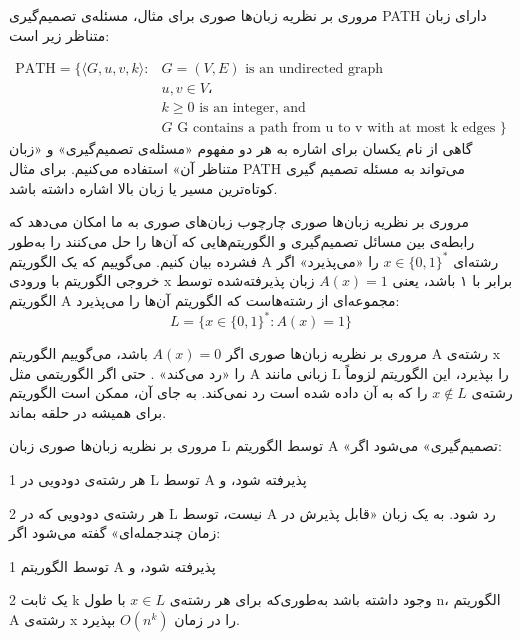 \begin{itemframe}{مروری بر نظریه زبان‌ها صوری}
\itm
برای مثال، مسئله‌ی تصمیم‌گیری PATH دارای زبان متناظر زیر است:

\begin{align*}
\text{PATH} = \{ \langle G, u, v, k \rangle :  & G = (V, E) \text{ is an undirected graph } \\
				& u, v \in V، \\
				& k \geq 0 \text{ is an integer, and } \\
				& G \text{ G contains a path from u to v with at most k edges }
\}
\end{align*}
\itm
گاهی از نام یکسان برای اشاره به هر دو مفهوم «مسئله‌ی تصمیم‌گیری» و «زبان متناظر آن» استفاده می‌کنیم. برای مثال PATH می‌تواند به مسئله تصمیم گیری کوتاه‌ترین مسیر یا زبان بالا اشاره داشته باشد.
\end{itemframe}


\begin{itemframe}{مروری بر نظریه زبان‌ها صوری}
\itm
چارچوب زبان‌های صوری به ما امکان می‌دهد که رابطه‌ی بین مسائل تصمیم‌گیری و الگوریتم‌هایی که آن‌ها را حل می‌کنند را به‌طور فشرده بیان کنیم.
\itm
می‌گوییم که یک الگوریتم A رشته‌ای
$x \in \{0,1\}^*$
 را «می‌پذیرد»
اگر خروجی الگوریتم با ورودی x برابر با ۱ باشد، یعنی
$A(x) = 1$
زبان پذیرفته‌شده توسط الگوریتم A مجموعه‌ای از رشته‌هاست که الگوریتم آن‌ها را می‌پذیرد:
$$
L = \{ x \in \{0,1\}^* : A(x) = 1 \}
$$
\end{itemframe}


\begin{itemframe}{مروری بر نظریه زبان‌ها صوری}
\itm
اگر
$A(x) = 0$
 باشد، می‌گوییم الگوریتم A رشته‌ی x را «رد می‌کند»
 .
\itm
حتی اگر الگوریتمی مثل A  زبانی مانند L را بپذیرد، این الگوریتم لزوماً رشته‌ی
$x \notin L$
را که به آن داده شده است رد نمی‌کند.
به جای آن، ممکن است الگوریتم برای همیشه در حلقه بماند.
\end{itemframe}


\begin{itemframe}{مروری بر نظریه زبان‌ها صوری}
\itm
زبان L توسط الگوریتم A «تصمیم‌گیری»
 می‌شود اگر:
\item[1]
هر رشته‌ی دودویی در L توسط A پذیرفته شود، و
\item[2]
هر رشته‌ی دودویی که در L نیست، توسط A رد شود.
\itm
به یک زبان «قابل پذیرش در زمان چندجمله‌ای»
گفته می‌شود اگر:
\item[1]
توسط الگوریتم A پذیرفته شود، و
\item[2]
یک ثابت k وجود داشته باشد به‌طوری‌که برای هر رشته‌ی $x \in L$ با طول n، الگوریتم A رشته‌ی x را در زمان $O(n^k)$ بپذیرد.

\end{itemframe}


